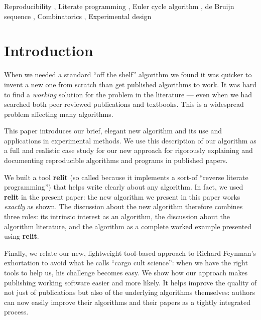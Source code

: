 \documentclass[preprint,times]{elsarticle}
\def\name#1{\textbf{#1}}
\begin{document}
\begin{keyword}
Reproducibility \sep
Literate programming \sep
Euler cycle algorithm \sep
de Bruijn sequence \sep
Combinatorics \sep
Experimental design
\end{keyword}



\maketitle

\section{Introduction}
When we needed a standard ``off the shelf'' algorithm we found it was quicker to invent a new one from scratch than get published algorithms to work. It was hard to find a \emph{working\/} solution for the problem in the literature --- even when we had searched both peer reviewed publications and textbooks. This is a widespread problem affecting many algorithms. 

This paper introduces our brief, elegant new algorithm and its use and applications in experimental methods. We use this description of our algorithm as a full and realistic case study for our new approach for rigorously explaining and documenting reproducible algorithms and programs in published papers. 

We built a tool \name{relit} (so called because it implements a sort-of ``reverse literate programming'') that helps write clearly about any algorithm. In fact, we used \name{relit} in the present paper: the new algorithm we present in this paper works \emph{exactly\/} as shown. The discussion about the new algorithm therefore combines three roles: its intrinsic interest as an algorithm, the discussion about the algorithm literature, and the algorithm as a complete worked example presented using \name{relit}.

Finally, we relate our new, lightweight tool-based approach to Richard Feynman's exhortation to avoid what he calls ``cargo cult science'': when we have the right tools to help us, his challenge becomes easy. We show how our approach makes publishing working software easier and more likely. It helps improve the quality of not just of publications but also of the underlying algorithms themselves: authors can now easily improve their algorithms and their papers as a tightly integrated process.
\end{document}
